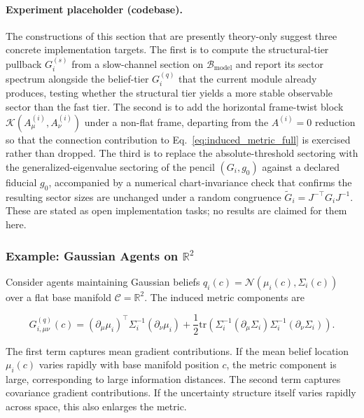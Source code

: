 \documentclass[11pt]{article}
\begin{document}
\paragraph{Experiment placeholder (codebase).} The constructions of this section that are presently theory-only suggest three concrete implementation targets. The first is to compute the structural-tier pullback $G_i^{(s)}$ from a slow-channel section on $\mathcal{B}_{\mathrm{model}}$ and report its sector spectrum alongside the belief-tier $G_i^{(q)}$ that the current module already produces, testing whether the structural tier yields a more stable observable sector than the fast tier. The second is to add the horizontal frame-twist block $\mathcal{K}(A^{(i)}_\mu, A^{(i)}_\nu)$ under a non-flat frame, departing from the $A^{(i)} = 0$ reduction so that the connection contribution to Eq.~\eqref{eq:induced_metric_full} is exercised rather than dropped. The third is to replace the absolute-threshold sectoring with the generalized-eigenvalue sectoring of the pencil $(G_i, g_0)$ against a declared fiducial $g_0$, accompanied by a numerical chart-invariance check that confirms the resulting sector sizes are unchanged under a random congruence $\tilde{G}_i = J^{-\top} G_i J^{-1}$. These are stated as open implementation tasks; no results are claimed for them here.

\subsubsection{Example: Gaussian Agents on $\mathbb{R}^2$}

Consider agents maintaining Gaussian beliefs $q_i(c) = \mathcal{N}(\mu_i(c), \Sigma_i(c))$ over a flat base manifold $\mathcal{C} = \mathbb{R}^2$. The induced metric components are

\begin{equation}
G^{(q)}_{i,\mu\nu}(c) = (\partial_\mu \mu_i)^\top \Sigma_i^{-1} (\partial_\nu \mu_i) + \frac{1}{2}\mathrm{tr}\left(\Sigma_i^{-1}(\partial_\mu \Sigma_i)\Sigma_i^{-1}(\partial_\nu \Sigma_i)\right).
\end{equation}

The first term captures mean gradient contributions. If the mean belief location $\mu_i(c)$ varies rapidly with base manifold position $c$, the metric component is large, corresponding to large information distances. The second term captures covariance gradient contributions. If the uncertainty structure itself varies rapidly across space, this also enlarges the metric.
\end{document}
